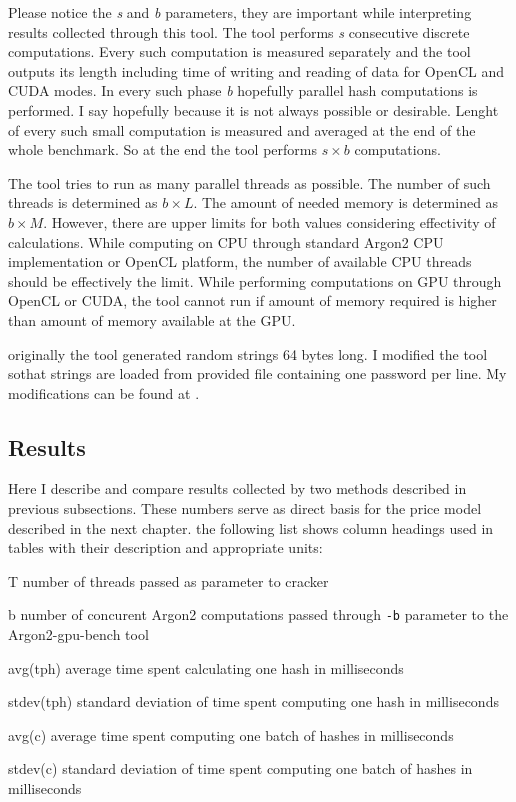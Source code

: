 \documentclass[nolof]{fithesis3}
\begin{document}
Please notice the \emph{s} and \emph{b} parameters, they are important while interpreting results collected through this tool. The tool performs \emph{s} consecutive discrete computations. Every such computation is measured separately and the tool outputs its length including time of writing and reading of data for OpenCL and CUDA modes. In every such phase \emph{b} hopefully parallel hash computations is performed. I say hopefully because it is not always possible or desirable. Lenght of every such small computation is measured and averaged at the end of the whole benchmark.  So at the end the tool performs $s \times b$ computations.

The tool tries to run as many parallel threads as possible. The number of such threads is determined as $b \times L$. The amount of needed memory is determined as $b \times M$. However, there are upper limits for both values considering effectivity of calculations. While computing on CPU through standard Argon2 CPU implementation or OpenCL platform, the number of available CPU threads should be effectively the limit. While performing computations on GPU through OpenCL or CUDA, the tool cannot run if amount of memory required is higher than amount of memory available at the GPU.

originally the tool generated random strings 64 bytes long. I modified the tool sothat strings are loaded from provided file containing one password per line. My modifications can be found at \parencite{argon2gpuvojta}.

\FloatBarrier

\subsection{Results}
Here I describe and compare results collected by two methods described in previous subsections. These numbers serve as direct basis for the price model described in the next chapter. the following list shows column headings used in tables with their description and appropriate units:

\begin{description}
\item{T} number of threads passed as parameter to cracker

\item{b} number of concurent Argon2 computations passed through \verb+-b+ parameter to the Argon2-gpu-bench tool

\item{avg(tph)} average time spent calculating one hash in milliseconds

\item{stdev(tph)} standard deviation of time spent computing one hash in milliseconds

\item{avg(c)} average time spent computing one batch of hashes in milliseconds

\item{stdev(c)} standard deviation of time spent computing one batch of hashes in milliseconds
\end{description}
\end{document}
